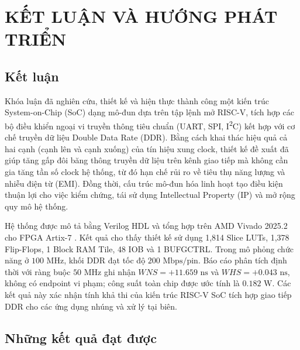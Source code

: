 \chapter{KẾT LUẬN VÀ HƯỚNG PHÁT TRIỂN}

\section{Kết luận}

Khóa luận đã nghiên cứu, thiết kế và hiện thực thành công một kiến trúc System-on-Chip (SoC) dạng mô-đun dựa trên tập lệnh mở RISC-V, tích hợp các bộ điều khiển ngoại vi truyền thông tiêu chuẩn (UART, SPI, I\textsuperscript{2}C) kết hợp với cơ chế truyền dữ liệu Double Data Rate (DDR). Bằng cách khai thác hiệu quả cả hai cạnh (cạnh lên và cạnh xuống) của tín hiệu xung clock, thiết kế đề xuất đã giúp tăng gấp đôi băng thông truyền dữ liệu trên kênh giao tiếp mà không cần gia tăng tần số clock hệ thống, từ đó hạn chế rủi ro về tiêu thụ năng lượng và nhiễu điện từ (EMI). Đồng thời, cấu trúc mô-đun hóa linh hoạt tạo điều kiện thuận lợi cho việc kiểm chứng, tái sử dụng Intellectual Property (IP) và mở rộng quy mô hệ thống.

Hệ thống được mô tả bằng Verilog HDL và tổng hợp trên AMD Vivado 2025.2 cho FPGA Artix-7 . Kết quả cho thấy thiết kế sử dụng 1,814 Slice LUTs, 1,378 Flip-Flops, 1 Block RAM Tile, 48 IOB và 1 BUFGCTRL. Trong mô phỏng chức năng ở $100\text{ MHz}$, khối DDR đạt tốc độ $200\text{ Mbps/pin}$. Báo cáo phân tích định thời với ràng buộc $50\text{ MHz}$ ghi nhận $WNS=+11.659\text{ ns}$ và $WHS=+0.043\text{ ns}$, không có endpoint vi phạm; công suất toàn chip được ước tính là $0.182\text{ W}$. Các kết quả này xác nhận tính khả thi của kiến trúc RISC-V SoC tích hợp giao tiếp DDR cho các ứng dụng nhúng và xử lý tại biên.

\section{Những kết quả đạt được}

